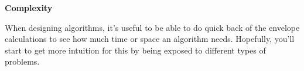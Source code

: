 \item {\bf Complexity }

When designing algorithms, it's useful to be able to do quick back of the
envelope calculations to see how much time or space an algorithm needs.
Hopefully, you'll start to get more intuition for this by being exposed to
different types of problems.

\begin{enumerate}

  

  

  

  

\end{enumerate}

